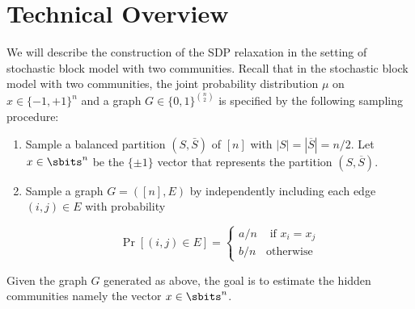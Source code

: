 \section{Technical Overview} %

We will describe the construction of the SDP relaxation in the setting of stochastic block model with two communities.
%
Recall that in the stochastic block model with two communities, the joint probability distribution $\mu$ on $x \in \{-1,+1\}^n$ and a graph $G \in \{0,1\}^{\binom{n}{2}}$ is specified by the following sampling procedure:
%
\begin{enumerate}
  \item Sample a balanced partition $(S, \bar{S})$ of $[n]$ with $|S| = |\overline{S}| = n/2$.  Let $x \in \sbits^n$ be the $\{\pm 1\}$ vector that represents the partition $(S,\overline{S})$.
  \item Sample a graph $G = ([n],E)$ by independently including each edge $(i,j) \in E$ with probability 

\[ \Pr[(i,j) \in E]= \begin{cases} a/n & \text{ if } x_i = x_j \\ b/n & \text{otherwise}\end{cases}\]
\end{enumerate}
%
Given the graph $G$ generated as above, the goal is to estimate the hidden communities namely the vector $x \in \sbits^n$.
%


